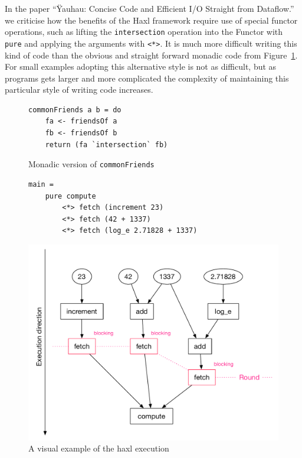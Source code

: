 In the paper ``Ÿauhau: Concise Code and Efficient I/O Straight from Dataflow.''~\cite{ErtelGoensAdamEtAl2016} we criticise how the benefits of the Haxl framework require use of special functor operations, such as lifting the \texttt{intersection} operation into the Functor with \texttt{pure} and applying the arguments with \texttt{<*>}.
It is much more difficult writing this kind of code than the obvious and straight forward monadic code from Figure~\ref{fig:monadic-common-friends}.
For small examples adopting this alternative style is not as difficult, but as programs gets larger and more complicated the complexity of maintaining this particular style of writing code increases.

\begin{figure}[h]
\begin{verbatim}
commonFriends a b = do
    fa <- friendsOf a
    fb <- friendsOf b
    return (fa `intersection` fb)
\end{verbatim}
\caption{Monadic version of \texttt{commonFriends}}
\label{fig:monadic-common-friends}
\end{figure}

\begin{figure}
\begin{verbatim}
main =
    pure compute
        <*> fetch (increment 23)
        <*> fetch (42 + 1337)
        <*> fetch (log_e 2.71828 + 1337)
\end{verbatim}
    \includegraphics[width=\linewidth]{../Figures/haxl-basic-example}
    \caption{A visual example of the haxl execution}
    \label{fig:haxl-basic-example}
\end{figure}


